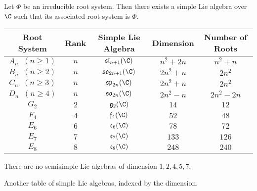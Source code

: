 \documentclass[a4paper]{article}
\begin{document}
\begin{crl}{}{} Let $\Phi$ be an irreducible root system. Then there exists a simple Lie algebra over $\C$ such that its associated root system is $\Phi$. 
\end{crl}

\begin{table}[!h]
\centering
\begin{tabular}{|c|c|c|c|c|}
\hline
Root System                                        & Rank & Simple Lie Algebra         & Dimension & Number of Roots \\ \hline
$A_n\;\;(n\geq 1)$ & $n$  & $\mathfrak{sl}_{n+1}(\C)$      & $n^2+2n$  & $n^2+n$         \\
$B_n\;\;(n\geq 2)$ & $n$  & $\mathfrak{so}_{2n+1}(\C)$ & $2n^2+n$  & $2n^2$          \\
$C_n\;\;(n\geq 3)$ & $n$  & $\mathfrak{sp}_{2n}(\C)$   & $2n^2+n$  & $2n^2$          \\
$D_n\;\;(n\geq 4)$ & $n$  & $\mathfrak{so}_{2n}(\C)$   & $2n^2-n$  & $2n^2-2n$       \\
$G_2$                                              & $2$  & $\mathfrak{g}_2(\C)$      & $14$      & $12$            \\
$F_4$                                              & $4$  & $\mathfrak{f}_4(\C)$       & $52$      & $48$            \\
$E_6$                                              & $6$  & $\mathfrak{e}_6(\C)$       & $78$      & $72$            \\
$E_7$                                              & $7$  & $\mathfrak{e}_7(\C)$       & $133$     & $126$           \\
$E_8$                                              & $8$  & $\mathfrak{e}_8(\C)$       & $248$     & $240$           \\ \hline
\end{tabular}
\end{table}

\begin{crl}{}{} There are no semisimple Lie algebras of dimension $1,2,4,5,7$. 
\end{crl}

Another table of simple Lie algebras, indexed by the dimension. 
\end{document}
